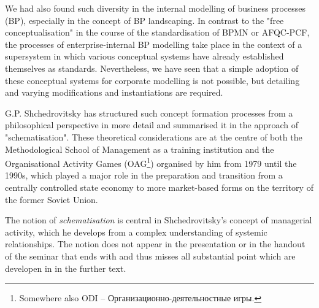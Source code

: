 \documentclass[11pt,a4paper]{article}
\begin{document}
We had also found such diversity in the internal modelling of business
processes (BP), especially in the concept of BP landscaping. In contrast to
the "free conceptualisation" in the course of the standardisation of BPMN or
AFQC-PCF, the processes of enterprise-internal BP modelling take place in the
context of a supersystem in which various conceptual systems have already
established themselves as standards. Nevertheless, we have seen that a simple
adoption of these conceptual systems for corporate modelling is not possible,
but detailing and varying modifications and instantiations are required.

G.P. Shchedrovitsky has structured such concept formation processes from a
philosophical perspective in more detail and summarised it in the approach of
"schematisation". These theoretical considerations are at the centre of both
the Methodological School of Management as a training institution and the
Organisational Activity Games (OAG\footnote{Somewhere also ODI --
  \foreignlanguage{russian}{Организационно-деятельностные игры}.}) organised
by him from 1979 until the 1990s, which played a major role in the preparation
and transition from a centrally controlled state economy to more market-based
forms on the territory of the former Soviet Union.

The notion of \emph{schematisation} is central in Shchedrovitsky's concept of
managerial activity, which he develops from a complex understanding of
systemic relationships. The notion does not appear in the presentation or in
the handout of the seminar that ends with \cite[figure 1.2, p. 11]{MSM} and
thus misses all substantial point which are developen in \cite{MSM} in the
further text.
\end{document}
